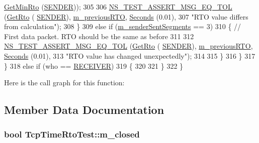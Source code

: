 \begin{DoxyCode}
      \hyperlink{classns3_1_1TcpGeneralTest_a3e84cd4e8c38a2fe6077fcbf26ec729e}{GetMinRto} (\hyperlink{classns3_1_1TcpGeneralTest_a29338e6b7137cad650c2ff835713f6eea5400e3d6b26928cf9e67ebb026462256}{SENDER}));
305 
306               \hyperlink{group__testing_ga9e7861b56b4e70db3b56044cb7a28e41}{NS\_TEST\_ASSERT\_MSG\_EQ\_TOL} (\hyperlink{classns3_1_1TcpGeneralTest_a9e657804bde27d35cfd99186e25f6145}{GetRto} (
      \hyperlink{classns3_1_1TcpGeneralTest_a29338e6b7137cad650c2ff835713f6eea5400e3d6b26928cf9e67ebb026462256}{SENDER}), \hyperlink{classTcpTimeRtoTest_a783e8a412243d5c091ace7b2e252789b}{m\_previousRTO}, \hyperlink{group__timecivil_ga33c34b816f8ff6628e33d5c8e9713b9e}{Seconds} (0.01),
307                                          \textcolor{stringliteral}{"RTO value differs from calculation"});
308             \}
309           \textcolor{keywordflow}{else} \textcolor{keywordflow}{if} (\hyperlink{classTcpTimeRtoTest_a186a4f5d05d6419be25d9de538848fab}{m\_senderSentSegments} == 3)
310             \{ \textcolor{comment}{// First data packet. RTO should be the same as before}
311 
312               \hyperlink{group__testing_ga9e7861b56b4e70db3b56044cb7a28e41}{NS\_TEST\_ASSERT\_MSG\_EQ\_TOL} (\hyperlink{classns3_1_1TcpGeneralTest_a9e657804bde27d35cfd99186e25f6145}{GetRto} (
      \hyperlink{classns3_1_1TcpGeneralTest_a29338e6b7137cad650c2ff835713f6eea5400e3d6b26928cf9e67ebb026462256}{SENDER}), \hyperlink{classTcpTimeRtoTest_a783e8a412243d5c091ace7b2e252789b}{m\_previousRTO}, \hyperlink{group__timecivil_ga33c34b816f8ff6628e33d5c8e9713b9e}{Seconds} (0.01),
313                                          \textcolor{stringliteral}{"RTO value has changed unexpectedly"});
314 
315             \}
316         \}
317     \}
318   \textcolor{keywordflow}{else} \textcolor{keywordflow}{if} (who == \hyperlink{classns3_1_1TcpGeneralTest_a29338e6b7137cad650c2ff835713f6eea2a9a39a8fe1edd25b643a48956b8ecff}{RECEIVER})
319     \{
320 
321     \}
322 \}
\end{DoxyCode}


Here is the call graph for this function\+:




\subsection{Member Data Documentation}
\subsubsection[{\texorpdfstring{m\+\_\+closed}{m_closed}}]{\setlength{\rightskip}{0pt plus 5cm}bool Tcp\+Time\+Rto\+Test\+::m\+\_\+closed\hspace{0.3cm}{\ttfamily [private]}}\hypertarget{classTcpTimeRtoTest_a9328545b0ec2c15fa47feb028120baea}{}\label{classTcpTimeRtoTest_a9328545b0ec2c15fa47feb028120baea}


